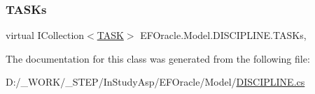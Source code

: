 \subsubsection{\texorpdfstring{T\+A\+S\+Ks}{TASKs}}
{\footnotesize\ttfamily virtual I\+Collection$<$\hyperlink{class_e_f_oracle_1_1_model_1_1_t_a_s_k}{T\+A\+SK}$>$ E\+F\+Oracle.\+Model.\+D\+I\+S\+C\+I\+P\+L\+I\+N\+E.\+T\+A\+S\+Ks\hspace{0.3cm}{\ttfamily [get]}, {\ttfamily [set]}}



The documentation for this class was generated from the following file\+:\begin{DoxyCompactItemize}
\item 
D\+:/\+\_\+\+W\+O\+R\+K/\+\_\+\+S\+T\+E\+P/\+In\+Study\+Asp/\+E\+F\+Oracle/\+Model/\hyperlink{_d_i_s_c_i_p_l_i_n_e_8cs}{D\+I\+S\+C\+I\+P\+L\+I\+N\+E.\+cs}\end{DoxyCompactItemize}
